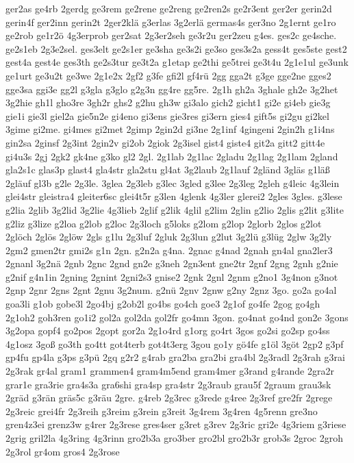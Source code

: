 {ger2as
ge4rb
2gerdg
ge3rem
ge2rene
ge2reng
ge2ren2s
ge2r3ent
ger2er
gerin2d
gerin4f
ger2inn
gerin2t
2ger2klä
g3erlas
3g2erlä
germas4s
ger3no
2g1ernt
ge1ro
ge2rob
ge1r2ö
4g3erprob
ger2sat
2g3er2seh
ge3r2u
ger2zeu
g4es.
ges2c
ge4sche.
ge2s1eb
2g3e2sel.
ges3elt
ge2s1er
ge3sha
ge3s2i
ge3so
ges3s2a
gess4t
ges5ste
gest2
gest4a
gest4e
ges3th
ge2s3tur
ge3t2a
g1etap
ge2thi
ge5trei
ge3t4u
2g1e1ul
ge3unk
ge1urt
ge3u2t
ge3we
2g1e2x
2gf2
g3fe
gfi2l
gf4rü
2gg
gga2t
g3ge
gge2ne
gges2
gge3sa
ggi3e
gg2l
g3gla
g3glo
g2g3n
gg4re
gg5re.
2g1h
gh2a
3ghale
gh2e
3g2het
3g2hie
gh1l
gho3re
3gh2r
ghs2
g2hu
gh3w
gi3alo
gich2
gicht1
gi2e
gi4eb
gie3g
gie1i
gie3l
giel2a
gie5n2e
gi4eno
gi3ens
gie3res
gi3ern
gies4
gift5s
gi2gu
gi2kel
3gime
gi2me.
gi4mes
gi2met
2gimp
2gin2d
gi3ne
2g1inf
4gingeni
2gin2h
g1i4ns
gin2sa
2ginsf
2g3int
2gin2v
gi2ob
2giok
2g3isel
gist4
giste4
git2a
gitt2
gitt4e
gi4u3s
2gj
2gk2
gk4ne
g3ko
gl2
2gl.
2g1lab
2g1lac
2gladu
2g1lag
2g1lam
2gland
gla2s1c
glas3p
glast4
gla4str
gla2stu
gl4at
3g2laub
2g1lauf
2gländ
3gläs
g1läß
2gläuf
gl3b
g2le
2g3le.
3glea
2g3leb
g3lec
3gled
g3lee
2g3leg
2gleh
g4leic
4g3lein
glei4str
gleistra4
gleiter6sc
glei4t5r
g3len
4glenk
4g3ler
glerei2
2gles
3gles.
g3lese
g2lia
2glib
3g2lid
3g2lie
4g3lieb
2glif
g2lik
4glil
g2lim
2glin
g2lio
2glis
g2lit
g3lite
g2liz
g3lize
g2loa
g2lob
g2loc
2g3loch
g5loks
g2lom
g2lop
2glorb
2glos
g2lot
2glöch
2glös
2glöw
2gls
g1lu
2g3luf
2gluk
2g3lun
g2lut
3g2lü
g3lüg
2glw
3g2ly
2gm2
gmen2tr
gmi2s
g1n
2gn.
g2n2a
g4na.
2gnac
g4nad
2gnah
gn4al
gna2ler3
2gnanl
3g2nä
2gnb
2gnc
2gnd
gn2e
g3neh
2gn3ent
gne2tr
2gnf
2gng
2gnh
g2nie
g2nif
g4n1in
2gning
2gnint
2gni2s3
gnise2
2gnk
2gnl
2gnm
g2no1
3g4non
g3not
2gnp
2gnr
2gns
2gnt
2gnu
3g2num.
g2nü
2gnv
2gnw
g2ny
2gnz
3go.
go2a
go4al
goa3li
g1ob
gobe3l
2go4bj
g2ob2l
go4bs
go4ch
goe3
2g1of
go4fe
2gog
go4gh
2g1oh2
goh3ren
go1i2
gol2a
gol2da
gol2fr
go4mn
3gon.
go4nat
go4nd
gon2e
3gons
3g2opa
gopf4
go2pos
2gopt
gor2a
2g1o4rd
g1org
go4rt
3gos
go2si
go2sp
go4ss
4g1osz
3goß
go3th
go4tt
got4terb
got4t3erg
3gou
go1y
gö4fe
g1öl
3göt
2gp2
g3pf
gp4fu
gp4la
g3ps
g3pü
2gq
g2r2
g4rab
gra2ba
gra2bi
gra4bl
2g3radl
2g3rah
g3rai
2g3rak
gr4al
gram1
grammen4
gram4m5end
gram4mer
g3rand
g4rande
2gra2r
grar1e
gra3rie
gra4s3a
gra6shi
gra4sp
gra4str
2g3raub
grau5f
2graum
grau3sk
2gräd
g3rän
gräs5c
g3räu
2gre.
g4reb
2g3rec
g3rede
g4ree
2g3ref
gre2fr
2grege
2g3reic
grei4fr
2g3reih
g3reim
g3rein
g3reit
3g4rem
3g4ren
4g5renn
gre3no
gren4z3ei
grenz3w
g4rer
2g3rese
gres4ser
g3ret
g3rev
2g3ric
gri2e
4g3riem
g3riese
2grig
gril2la
4g3ring
4g3rinn
gro2b3a
gro3ber
gro2bl
gro2b3r
grob3s
2groc
2groh
2g3rol
gr4om
gros4
2g3rose
}
